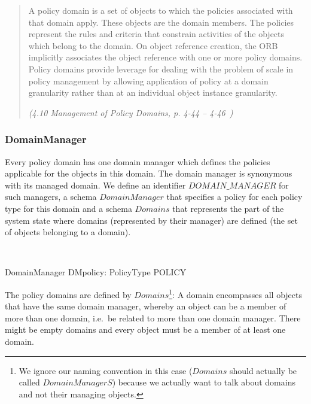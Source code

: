 \begin{quote}
  A policy domain is a set of objects to which the policies associated with that
  domain apply. These objects are the domain members. The policies represent the
  rules and criteria that constrain activities of the objects which belong to
  the domain. On object reference creation, the ORB implicitly associates the
  object reference with one or more policy domains. Policy domains provide
  leverage for dealing with the problem of scale in policy management by
  allowing application of policy at a domain granularity rather than at an
  individual object instance granularity.
  
  \hspace*{\fill}\emph{(4.10 Management of Policy Domains, p. 4-44 --
    4-46~\cite{omg:CORBA:2.4:2000})}
\end{quote}



\subsubsection{DomainManager} \label{sec:DomainManager}

Every policy domain has one domain manager which defines the policies applicable
for the objects in this domain.  The domain manager is synonymous with its
managed domain.  We define an identifier $DOMAIN\_MANAGER$ for such managers, a
schema $DomainManager$ that specifies a policy for each policy type for this
domain and a schema $Domains$ that represents the part of the system state where
domains (represented by their manager) are defined (the set of objects belonging
to a domain).
\begin{zedgroup}
  \begin{zed}
     \\
  \end{zed}
  \begin{schema}{DomainManager}
    DMpolicy: PolicyType \pinj POLICY \\
  \end{schema}
\end{zedgroup}
The policy domains are defined by $Domains$\footnote{We ignore our naming
  convention in this case ($Domains$ should actually be called $DomainManagerS$)
  because we actually want to talk about domains and not their managing
  objects.}: A domain encompasses all objects that have the same domain manager,
whereby an object can be a member of more than one domain, i.e.\ be related to
more than one domain manager.  There might be empty domains and every object
must be a member of at least one domain.

